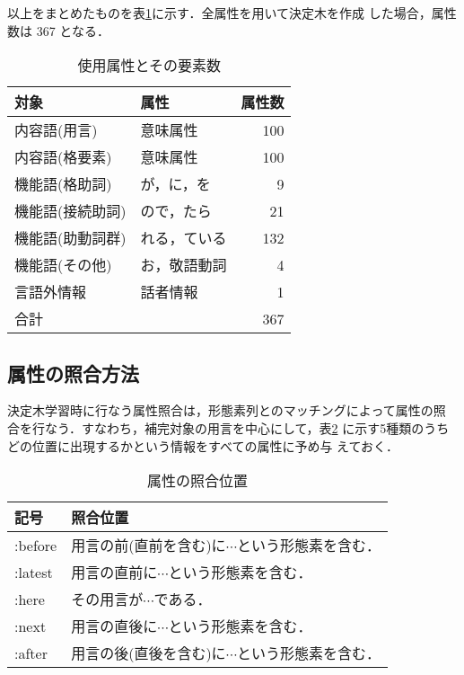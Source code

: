 以上をまとめたものを表\ref{表:属性}に示す．全属性を用いて決定木を作成
した場合，属性数は 367 となる．


\begin{table}
\begin{center}
\caption{使用属性とその要素数}
\label{表:属性}
\vspace{3mm}
\begin{tabular}{llr}
\hline\hline
対象           & 属性       & 属性数 \\
\hline
内容語(用言)   & 意味属性   & 100 \\
内容語(格要素) & 意味属性   & 100 \\
\hline
機能語(格助詞)   & が，に，を    &   9 \\
機能語(接続助詞) & ので，たら    &  21 \\
機能語(助動詞群) & れる，ている  & 132 \\
機能語(その他)   & お，敬語動詞  &   4 \\
\hline
言語外情報     & 話者情報     &   1 \\
\hline
合計           &              & 367 \\
\hline
\end{tabular}
\end{center}
\end{table}


\subsection{属性の照合方法}

決定木学習時に行なう属性照合は，形態素列とのマッチングによって属性の照
合を行なう．すなわち，補完対象の用言を中心にして，表\ref{表:照合位置}
に示す5種類のうちどの位置に出現するかという情報をすべての属性に予め与
えておく．

\begin{table}
\begin{center}
\caption{属性の照合位置}
\label{表:照合位置}
\vspace{3mm}
\begin{tabular}{ll}
\hline\hline
記号    & 照合位置 \\
\hline
:before &  用言の前(直前を含む)に$\cdots$という形態素を含む． \\
:latest &  用言の直前に$\cdots$という形態素を含む． \\
:here &  その用言が$\cdots$である． \\
:next &  用言の直後に$\cdots$という形態素を含む． \\
:after &  用言の後(直後を含む)に$\cdots$という形態素を含む． \\
\hline
\end{tabular}
\end{center}
\end{table}


